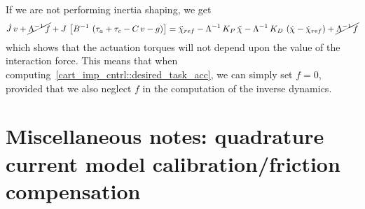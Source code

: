 \documentclass[letterpaper, 10 pt, conference]{ieeeconf}  %
\begin{document}
If we are not performing inertia shaping, we get
\begin{dmath}
\dot{J}\,v+\cancel{\Lambda^{-1}\,f} + J\,\left[B^{-1}\,\left(\tau_a + \tau_c - C\,v - g\right)\right] = \ddot{\chi}_{ref} - \Lambda^{-1}\,K_{P}\,\tilde{\chi} - \Lambda^{-1}\,K_D\,\left(\dot{\chi} - \dot{\chi}_{ref}\right) + \cancel{\Lambda^{-1}\,f}
\end{dmath}
which shows that the actuation torques will not depend upon the value of the interaction force. This means that when computing~\eqref{cart_imp_cntrl::desired_task_acc}, we can simply set $f=0$, provided that we also neglect $f$ in the computation of the inverse dynamics.
\clearpage

\section{Miscellaneous notes: quadrature current model calibration/friction compensation}\label{section::iq_model}
\end{document}
